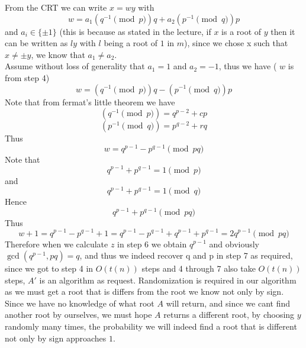 \documentclass{article}
\begin{document}
From the CRT we can write $x = wy$ with 
\[w = a_1(q^{-1} \pmod p)q + a_2(p^{-1} \pmod q)p\]
and $a_i \in \{\pm 1\}$ (this is because as stated in the lecture, if $x$ is a root of $y$ then it can be written as $ly$ with $l$ being a root of $1$ in $m$), since we chose x such that $x \neq \pm y$, we know that $a_1 \neq a_2$.\\
Assume without loss of generality that $a_1 = 1$ and  $a_2 = -1$, thus we have ( $w$ is from step 4)
\[w = (q^{-1} \pmod p)q - (p^{-1} \pmod q)p \]
Note that from fermat's little theorem we have 
\[(q^{-1} \pmod p)= q^{p-2} + cp\]
\[(p^{-1} \pmod q)= p^{q-2} + rq\]
Thus 
\[w = q^{p-1} - p^{q-1} \pmod {pq}\]
Note that 
\[q^{p-1} + p^{q-1} = 1 \pmod p\]
and
\[q^{p-1} + p^{q-1}  = 1 \pmod q\]
Hence
\[q^{p-1} + p^{q-1} \pmod {pq}\]
Thus
\[w + 1 = q^{p-1} - p^{q-1} + 1  = q^{p-1} - p^{q-1} + q^{p-1} + p^{q-1} = 2q^{p-1} \pmod {pq}\]
Therefore when we calculate $z$ in step 6 we obtain $q^{p-1}$ and obviously $\gcd(q^{p-1}, pq) = q$, and thus we indeed recover q and p in step 7 as required, since we got to step 4 in $O(t(n))$ steps and 4 through 7 also take $O(t(n))$ steps, $A'$ is an algorithm as request.
Randomization is required in our algorithm as we must get a root that is differs from the root we know not only by sign. Since we have no knowledge of what root $A$ will return, and since we cant find another root by ourselves, we must hope $A$ returns a different root, by choosing $y$ randomly many times, the probability we will indeed find a root that is different not only by sign approaches $1$.
 

\section{} %

\section{} %

\section{} %
\end{document}
